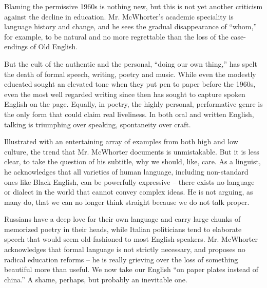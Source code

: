 


Blaming the permissive 1960s is nothing new, but this is not yet another criticism against the decline in education. Mr. McWhorter’s academic speciality is language history and change, and he sees the gradual disappearance of “whom,” for example, to be natural and no more regrettable than the loss of the case-endings of Old English.

But the cult of the authentic and the personal, “doing our own thing,” has spelt the death of formal speech, writing, poetry and music. While even the modestly educated sought an elevated tone when they put pen to paper before the 1960s, even the most well regarded writing since then has sought to capture spoken English on the page. Equally, in poetry, the highly personal, performative genre is the only form that could claim real liveliness. In both oral and written English, talking is triumphing over speaking, spontaneity over craft.

Illustrated with an entertaining array of examples from both high and low culture, the trend that Mr. McWhorter documents is unmistakable. But it is less clear, to take the question of his subtitle, why we should, like, care. As a linguist, he acknowledges that all varieties of human language, including non-standard ones like Black English, can be powerfully expressive -- there exists no language or dialect in the world that cannot convey complex ideas. He is not arguing, as many do, that we can no longer think straight because we do not talk proper.

Russians have a deep love for their own language and carry large chunks of memorized poetry in their heads, while Italian politicians tend to elaborate speech that would seem old-fashioned to most English-speakers. Mr. McWhorter acknowledges that formal language is not strictly necessary, and proposes no radical education reforms -- he is really grieving over the loss of something beautiful more than useful. We now take our English “on paper plates instead of china.” A shame, perhaps, but probably an inevitable one.

